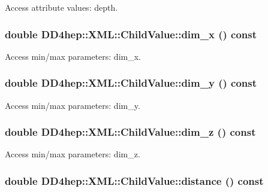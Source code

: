 Access attribute values: depth. \hypertarget{struct_d_d4hep_1_1_x_m_l_1_1_child_value_a846d222d0b881ab8da9caff1b4147126}{
\subsubsection[{dim\_\-x}]{\setlength{\rightskip}{0pt plus 5cm}double DD4hep::XML::ChildValue::dim\_\-x () const}}
\label{struct_d_d4hep_1_1_x_m_l_1_1_child_value_a846d222d0b881ab8da9caff1b4147126}


Access min/max parameters: dim\_\-x. \hypertarget{struct_d_d4hep_1_1_x_m_l_1_1_child_value_a7ca927dcbd6ff1c2e6362567cf0f1019}{
\subsubsection[{dim\_\-y}]{\setlength{\rightskip}{0pt plus 5cm}double DD4hep::XML::ChildValue::dim\_\-y () const}}
\label{struct_d_d4hep_1_1_x_m_l_1_1_child_value_a7ca927dcbd6ff1c2e6362567cf0f1019}


Access min/max parameters: dim\_\-y. \hypertarget{struct_d_d4hep_1_1_x_m_l_1_1_child_value_a7bdb25610e0b848e980022a86d2f43cf}{
\subsubsection[{dim\_\-z}]{\setlength{\rightskip}{0pt plus 5cm}double DD4hep::XML::ChildValue::dim\_\-z () const}}
\label{struct_d_d4hep_1_1_x_m_l_1_1_child_value_a7bdb25610e0b848e980022a86d2f43cf}


Access min/max parameters: dim\_\-z. \hypertarget{struct_d_d4hep_1_1_x_m_l_1_1_child_value_a525e776ba0eb83d7e6c6d340b2e86d11}{
\subsubsection[{distance}]{\setlength{\rightskip}{0pt plus 5cm}double DD4hep::XML::ChildValue::distance () const}}
\label{struct_d_d4hep_1_1_x_m_l_1_1_child_value_a525e776ba0eb83d7e6c6d340b2e86d11}


